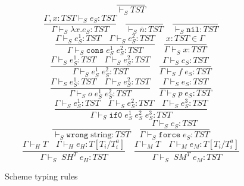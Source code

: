 \begin{figure}[p]
\[
\frac{}{\vdash_{S}TST}
\]
\bigskip
\[
\frac{\Gamma,x:TST\vdash_{S}e_{S}:TST}{\Gamma\vdash_{S}\lambda x.e_{S}:TST}
\quad
\frac{}{\vdash_{S}\overline{n}:TST}
\quad
\frac{}{\vdash_{S}\mathtt{nil}:TST}
\]
\[
\frac{\Gamma\vdash_{S}e_{S}^{1}:TST\quad\Gamma\vdash_{S}e_{S}^{2}:TST}{\Gamma\vdash_{S}\mathtt{cons}\;e_{S}^{1}\;e_{S}^{2}:TST}
\quad
\frac{x:TST\in\Gamma}{\Gamma\vdash_{S}x:TST}
\]
\[
\frac{\Gamma\vdash_{S}e_{S}^{1}:TST\quad\Gamma\vdash_{S}e_{S}^{2}:TST}{\Gamma\vdash_{S}e_{S}^{1}\;e_{S}^{2}:TST}
\quad
\frac{\Gamma\vdash_{S}e_{S}:TST}{\Gamma\vdash_{S}f\;e_{S}:TST}
\]
\[
\frac{\Gamma\vdash_{S}e_{S}^{1}:TST\quad\Gamma\vdash_{S}e_{S}^{2}:TST}{\Gamma\vdash_{S}o\;e_{S}^{1}\;e_{S}^{2}:TST}
\quad
\frac{\Gamma\vdash_{S}e_{S}:TST}{\Gamma\vdash_{S}p\;e_{S}:TST}
\]
\[
\frac{\Gamma\vdash_{S}e_{S}^{1}:TST\quad\Gamma\vdash_{S}e_{S}^{2}:TST\quad\Gamma\vdash_{S}e_{S}^{3}:TST}{\Gamma\vdash_{S}\mathtt{if0}\;e_{S}^{1}\;e_{S}^{2}\;e_{S}^{3}:TST}
\]
\[
\frac{}{\vdash_{S}\mathtt{wrong}\;\mathrm{string}:TST}
\quad
\frac{\Gamma\vdash_{S}e_{S}:TST}{\Gamma\vdash_{S}\mathtt{force}\;e_{S}:TST}
\]
\[
\frac{\Gamma\vdash_{H}T\quad\Gamma\vdash_{H}e_{H}:T[T_{i}/T^{a}_{i}]}{\Gamma\vdash_{S}\;SH^{T}\;e_{H}:TST}
\quad
\frac{\Gamma\vdash_{M}T\quad\Gamma\vdash_{M}e_{M}:T[T_{i}/T^{a}_{i}]}{\Gamma\vdash_{S}\;SM^{T}\;e_{M}:TST}
\]
\caption{Scheme typing rules}
\label{str}
\end{figure}